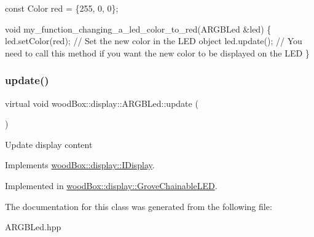 \begin{DoxyCode}
\textcolor{keyword}{const} Color red = \{255, 0, 0\};

\textcolor{keywordtype}{void} my\_function\_changing\_a\_led\_color\_to\_red(ARGBLed &led) \{
  led.setColor(red); \textcolor{comment}{// Set the new color in the LED object}
  led.update(); \textcolor{comment}{// You need to call this method if you want the new color to be displayed on the LED}
\}
\end{DoxyCode}
 \mbox{\label{classwood_box_1_1display_1_1_a_r_g_b_led_ab71f321d91e931f95b96d1f492a9454d}} 
\subsubsection{\texorpdfstring{update()}{update()}}
{\footnotesize\ttfamily virtual void wood\+Box\+::display\+::\+A\+R\+G\+B\+Led\+::update (\begin{DoxyParamCaption}{ }\end{DoxyParamCaption})\hspace{0.3cm}{\ttfamily [pure virtual]}}

Update display content 

Implements \mbox{\hyperlink{classwood_box_1_1display_1_1_i_display_ad8c0811b8b807ce119a06c7806004de7}{wood\+Box\+::display\+::\+I\+Display}}.



Implemented in \mbox{\hyperlink{classwood_box_1_1display_1_1_grove_chainable_l_e_d_a650969665d0b5607465a63159c62e4ef}{wood\+Box\+::display\+::\+Grove\+Chainable\+L\+ED}}.



The documentation for this class was generated from the following file\+:\begin{DoxyCompactItemize}
\item 
A\+R\+G\+B\+Led.\+hpp\end{DoxyCompactItemize}
